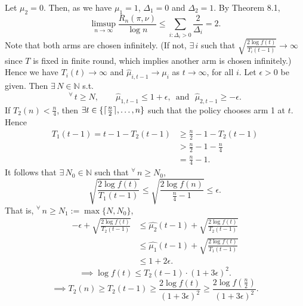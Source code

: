 \documentclass[10pt]{article}
\theoremstyle{definition}
\newenvironment{solution*}[1]{%
  \IfBlankTF{#1}
    {\renewcommand{\themanualsolutioninner}{\unskip}}
    {\renewcommand\themanualsolutioninner{#1}}%
  \manualsolutioninner
}{\endmanualsolutioninner}
\DeclarePairedDelimiter{\ceil}{\lceil}{\rceil}
\begin{document}
\begin{solution*}{}
    Let $\mu_2 = 0$. Then, as we have $\mu_1 = 1$, $\Delta_1 = 0$ and $\Delta_2 = 1$.
    By Theorem 8.1,
    \begin{equation*}
        \limsup_{n \to \infty} \frac{R_n (\pi, \nu)}{\log n} \leq \sum_{i : \Delta_i >0} \frac{2}{\Delta_i} = 2. \tag{*}
    \end{equation*}
    Note that both arms are chosen infinitely. (If not, $\exists \, i$ such that $\sqrt{\frac{2\log f(t)}{T_i(t-1)}} \to \infty$ since $T$ is fixed in finite round, which implies another arm is chosen infinitely.)
    Hence we have $T_i(t) \to \infty$ and $\hat{\mu}_{i,t-1} \to \mu_i$ as $t \to \infty$, for all $i$.
    Let $\epsilon > 0$ be given. Then $\exists \, N \in \mathbb{N}$ s.t.
    \begin{equation*}
        ^\forall \, t \geq N, \qquad \hat{\mu}_{1,t-1} \leq 1+ \epsilon, \, \text{ and } \,\, \hat{\mu}_{2,t-1} \geq -\epsilon.
    \end{equation*}
    If $T_2 (n) < \frac{n}{4}$, then $\exists t \in \{ \ceil{\frac{n}{2}}, \ldots, n \}$ such that the policy chooses arm 1 at $t$.
    Hence
    \begin{align*}
        T_1(t-1) = t-1-T_2(t-1) &\geq \frac{n}{2} -1 -T_2 (t-1) \\
        &> \frac{n}{2} -1 -\frac{n}{4} \\
        &= \frac{n}{4} -1.
    \end{align*}
    It follows that $\exists \, N_0 \in \mathbb{N}$ such that $^\forall \, n \geq N_0$,
    \begin{equation*}
        \sqrt{\frac{2\log f(t)}{T_1 (t-1)}} \leq \sqrt{\frac{2\log f(n)}{\frac{n}{4} -1}} \leq \epsilon.
    \end{equation*}
    That is, $^\forall \, n \geq N_1 := \max \{N, N_0\}$,
    \begin{align*}
        -\epsilon + \sqrt{\frac{2\log f(t)}{T_2 (t-1)}} &\leq \hat{\mu_2}(t-1)+ \sqrt{\frac{2\log f(t)}{T_2(t-1)}} \\
        &\leq \hat{\mu_1}(t-1) + \sqrt{\frac{2\log f(t)}{T_1 (t-1)}} \\
        &\leq 1 + 2\epsilon.
    \end{align*}
    \begin{equation*}
        \implies \log f(t) \leq T_2 (t-1) \cdot (1+3\epsilon)^2.
    \end{equation*}
    \begin{equation*}
        \implies T_2(n) \geq T_2(t-1) \geq \frac{2 \log f(t)}{(1+3\epsilon)^2} \geq \frac{2\log f(\frac{n}{2})}{(1+3\epsilon)^2}.

\end{equation*}
\end{solution*}
\end{document}
